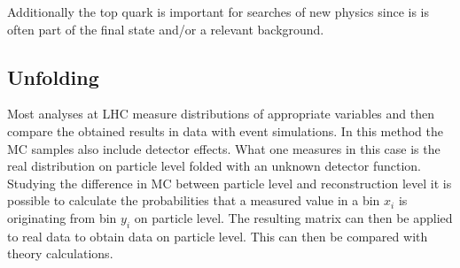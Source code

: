 	Additionally the top quark is important for searches of new physics since is is often part of the final state and/or a relevant background.

\subsection{Unfolding}
	Most analyses at LHC measure distributions of appropriate variables and then compare the obtained results in data with event simulations. In this method the MC samples also include detector effects. What one measures in this case is the real distribution on particle level folded with an unknown detector function. Studying the difference in MC between particle level and reconstruction level it is possible to calculate the probabilities that a measured value in a bin $x_i$ is originating from bin $y_i$ on particle level. The resulting matrix can then be applied to real data to obtain data on particle level. This can then be compared with theory calculations.
	